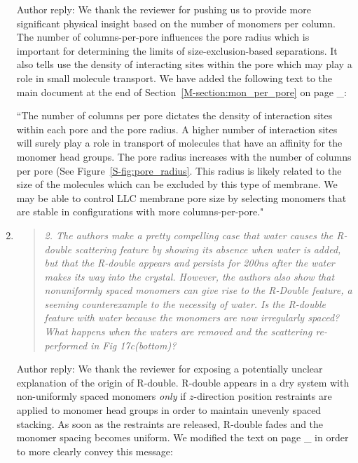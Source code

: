 \documentclass{article}
\begin{document}
\begin{enumerate}
    Author reply: We thank the reviewer for pushing us to provide more significant physical insight based
    on the number of monomers per column. The number of columns-per-pore influences the pore radius which
    is important for determining the limits of size-exclusion-based separations. It also tells use the 
    density of interacting sites within the pore which may play a role in small molecule transport. We have
    added the following text to the main document at the end of Section~\ref{M-section:mon_per_pore} on 
    page _:
    
    ``The number of columns per pore dictates the density of interaction sites within each pore and the 
    pore radius. A higher number of interaction sites will surely play a role in transport of molecules
    that have an affinity for the monomer head groups. 
    The pore radius increases with the number of columns per pore (See Figure~\ref{S-fig:pore_radius}. 
    This radius is likely related to the size of the molecules which can be excluded by this type of 
    membrane. We may be able to control LLC membrane pore size by selecting monomers that are stable
    in configurations with more columns-per-pore."
    
    \item \begin{quote}
    \textit{2. The authors make a pretty compelling case that water causes the R-double scattering feature
    by showing its absence when water is added, but that the R-double appears and persists for 200ns after
    the water makes its way into the crystal. However, the authors also show that nonuniformly spaced
    monomers can give rise to the R-Double feature, a seeming counterexample to the necessity of water.
    Is the R-double feature with water because the monomers are now irregularly spaced? What happens when
    the waters are removed and the scattering re-performed in Fig 17c(bottom)?}
    \end{quote}
    
    Author reply: We thank the reviewer for exposing a potentially unclear
    explanation of the origin of R-double. R-double appears in a dry system with
    non-uniformly spaced monomers \textit{only} if $z$-direction position
    restraints are applied to monomer head groups in order to maintain unevenly
    spaced stacking. As soon as the restraints are released, R-double fades and the
    monomer spacing becomes uniform. We modified the text on page _ in order to more
    clearly convey this message:
 

\end{enumerate}
\end{document}
